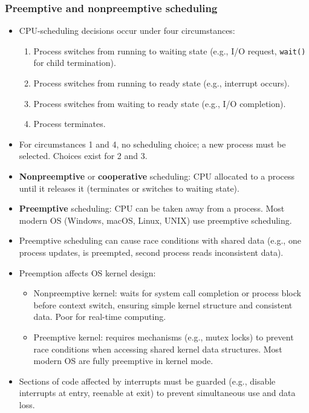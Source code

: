 \subsubsection{Preemptive and nonpreemptive scheduling}
\begin{itemize}
    \item CPU-scheduling decisions occur under four circumstances:
    \begin{enumerate}
        \item Process switches from running to waiting state (e.g., I/O request, \texttt{wait()} for child termination).
        \item Process switches from running to ready state (e.g., interrupt occurs).
        \item Process switches from waiting to ready state (e.g., I/O completion).
        \item Process terminates.
    \end{enumerate}
    \item For circumstances 1 and 4, no scheduling choice; a new process must be selected. Choices exist for 2 and 3.
    \item \textbf{Nonpreemptive} or \textbf{cooperative} scheduling: CPU allocated to a process until it releases it (terminates or switches to waiting state).
    \item \textbf{Preemptive} scheduling: CPU can be taken away from a process. Most modern OS (Windows, macOS, Linux, UNIX) use preemptive scheduling.
    \item Preemptive scheduling can cause race conditions with shared data (e.g., one process updates, is preempted, second process reads inconsistent data).
    \item Preemption affects OS kernel design:
        \begin{itemize}
            \item Nonpreemptive kernel: waits for system call completion or process block before context switch, ensuring simple kernel structure and consistent data. Poor for real-time computing.
            \item Preemptive kernel: requires mechanisms (e.g., mutex locks) to prevent race conditions when accessing shared kernel data structures. Most modern OS are fully preemptive in kernel mode.
        \end{itemize}
    \item Sections of code affected by interrupts must be guarded (e.g., disable interrupts at entry, reenable at exit) to prevent simultaneous use and data loss.
\end{itemize}

